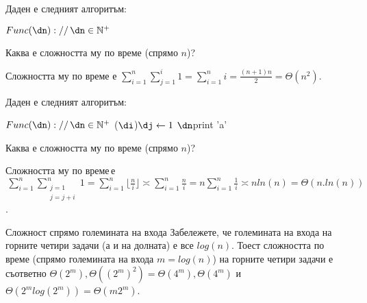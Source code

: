 \begin{problem}
	Даден е следният алгоритъм:
	\begin{pseudocode}
		
		$Func(\dn)://\,\dn\in\mathbb{N}^+$
		\Mybegin
		{
			{
			}
		}
	\end{pseudocode}
	Каква е сложността му по време (спрямо $n$)?
\end{problem}
\begin{solution}
	Сложността му по време е $\sum\limits_{i=1}^n\sum\limits_{j=1}^i1=\sum\limits_{i=1}^n i=\frac{(n+1)n}{2}=\Theta(n^2)$.
\end{solution}\leavevmode\newline

\begin{problem}
	Даден е следният алгоритъм:
	\begin{pseudocode}
		\SetKwData{di}{i}
		\SetKwData{dj}{j}
		\SetKwData{dn}{n}
		
		$Func(\dn)://\,\dn\in\mathbb{N}^+$
		\Mybegin
		{
			\Myfor{$\di\leftarrow1$ \KwTo $\dn$}
			{
				\Myfor(\Withstep $\di$){$\dj\leftarrow1$ \KwTo $\dn$}{print 'a'\;}
			}
		}
	\end{pseudocode}
	Каква е сложността му по време (спрямо $n$)?
\end{problem}
\begin{solution}
	Сложността му по време$\,$е$\,\sum\limits_{i=1}^n\sum\limits_{\substack{j=1\\j=j+i}}^n1=\sum\limits_{i=1}^n\lfloor\frac ni\rfloor\asymp\sum\limits_{i=1}^n\frac ni=n\sum\limits_{i=1}^n\frac1i\asymp nln(n)=\Theta(n.ln(n))$.
\end{solution}\leavevmode\newline

\begin{boxremark}{Сложност спрямо големината на входа}{}
	Забележете, че големината на входа на горните четири задачи (а и на долната) е все $log(n)$. Тоест сложността по време (спрямо големината на входа $m=log(n)$) на горните четири задачи е съответно $\Theta(2^m),\Theta((2^m)^2)=\Theta(4^m),\Theta(4^m)$ и $\Theta(2^mlog(2^m))=\Theta(m2^m)$.
\end{boxremark}\leavevmode\newline

